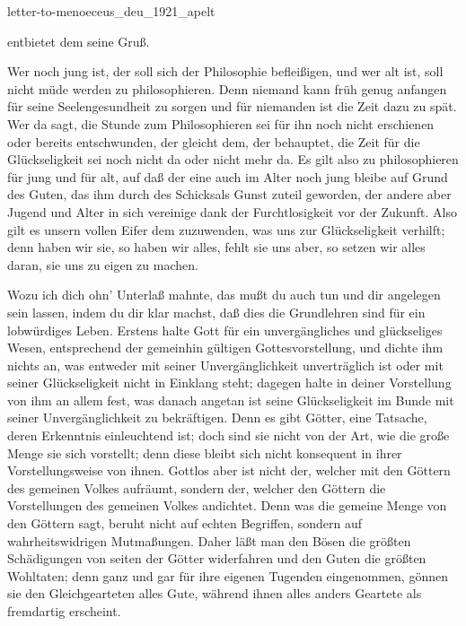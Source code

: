 \documentclass{stex}
\begin{document}
\begin{smodule}{letter-to-menoeceus_deu_1921_apelt}


\begin{sparagraph}[id=letter-to-menoeceus,name=Letter to Menoeceus]
  \noindent {} entbietet dem  seine Gruß.

  \vspace{1em}
  Wer noch jung ist, der soll sich der Philosophie befleißigen, und wer alt ist, soll nicht müde werden zu philosophieren.
  Denn niemand kann früh genug anfangen für seine Seelengesundheit zu sorgen und für niemanden ist die Zeit dazu zu spät.
  Wer da sagt, die Stunde zum Philosophieren sei für ihn noch nicht erschienen oder bereits entschwunden, der gleicht dem, der behauptet, die Zeit für die Glückseligkeit sei noch nicht da oder nicht mehr da.
  Es gilt also zu philosophieren für jung und für alt, auf daß der eine auch im Alter noch jung bleibe auf Grund des Guten, das ihm durch des Schicksals Gunst zuteil geworden, der andere aber Jugend und Alter in sich vereinige dank der Furchtlosigkeit vor der Zukunft.
  Also gilt es unsern vollen Eifer dem zuzuwenden, was uns zur Glückseligkeit verhilft; denn haben wir sie, so haben wir alles, fehlt sie uns aber, so setzen wir alles daran, sie uns zu eigen zu machen.

  Wozu ich dich ohn’ Unterlaß mahnte, das mußt du auch tun und dir angelegen sein lassen, indem du dir klar machst, daß dies die Grundlehren sind für ein lobwürdiges Leben.
  Erstens halte Gott für ein unvergängliches und glückseliges Wesen, entsprechend der gemeinhin gültigen Gottesvorstellung, und dichte ihm nichts an, was entweder mit seiner Unvergänglichkeit unverträglich ist oder mit seiner Glückseligkeit nicht in Einklang steht; dagegen halte in deiner Vorstellung von ihm an allem fest, was danach angetan ist seine Glückseligkeit im Bunde mit seiner Unvergänglichkeit zu bekräftigen.
  Denn es gibt Götter, eine Tatsache, deren Erkenntnis einleuchtend ist; doch sind sie nicht von der Art, wie die große Menge sie sich vorstellt; denn diese bleibt sich nicht konsequent in ihrer Vorstellungsweise von ihnen.
  Gottlos aber ist nicht der, welcher mit den Göttern des gemeinen Volkes aufräumt, sondern der, welcher den Göttern die Vorstellungen des gemeinen Volkes andichtet.
  Denn was die gemeine Menge von den Göttern sagt, beruht nicht auf echten Begriffen, sondern auf wahrheitswidrigen Mutmaßungen.
  Daher läßt man den Bösen die größten Schädigungen von seiten der Götter widerfahren und den Guten die größten Wohltaten; denn ganz und gar für ihre eigenen Tugenden eingenommen, gönnen sie den Gleichgearteten alles Gute, während ihnen alles anders Geartete als fremdartig erscheint.


\end{sparagraph}
\end{smodule}
\end{document}
